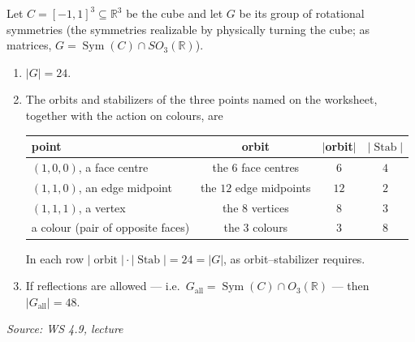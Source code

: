 \documentclass[11pt]{report}
\newcommand{\srcline}[1]{\par\hfill{\footnotesize\textit{Source: #1}}}
\begin{document}
\begin{propbox}\label{prop:rotational-symmetries-cube}
Let $C = [-1,1]^3 \subseteq \mathbb{R}^3$ be the cube and let $G$ be its group of rotational symmetries (the symmetries realizable by physically turning the cube; as matrices, $G = \operatorname{Sym}(C) \cap SO_3(\mathbb{R})$).
\begin{enumerate}
    \item $|G| = 24$.
    \item The orbits and stabilizers of the three points named on the worksheet, together with the action on colours, are
    \begin{center}
    \begin{tabular}{lccc}
    point & orbit & $|$orbit$|$ & $|\operatorname{Stab}|$ \\ \hline
    $(1,0,0)$, a face centre & the $6$ face centres & $6$ & $4$ \\
    $(1,1,0)$, an edge midpoint & the $12$ edge midpoints & $12$ & $2$ \\
    $(1,1,1)$, a vertex & the $8$ vertices & $8$ & $3$ \\
    a colour (pair of opposite faces) & the $3$ colours & $3$ & $8$
    \end{tabular}
    \end{center}
    In each row $|\operatorname{orbit}| \cdot |\operatorname{Stab}| = 24 = |G|$, as orbit--stabilizer requires.
    \item If reflections are allowed --- i.e.\ $G_{\mathrm{all}} = \operatorname{Sym}(C) \cap O_3(\mathbb{R})$ --- then $|G_{\mathrm{all}}| = 48$.
\end{enumerate}
\srcline{WS 4.9, lecture}
\end{propbox}
\end{document}

